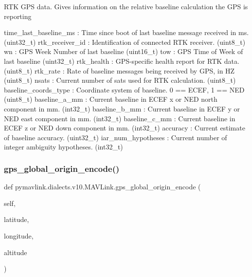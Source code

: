 \begin{DoxyVerb}
\begin{DoxyVerb}
\begin{DoxyVerb}RTK GPS data. Gives information on the relative baseline calculation
the GPS is reporting

time_last_baseline_ms        : Time since boot of last baseline message received in ms. (uint32_t)
rtk_receiver_id           : Identification of connected RTK receiver. (uint8_t)
wn                        : GPS Week Number of last baseline (uint16_t)
tow                       : GPS Time of Week of last baseline (uint32_t)
rtk_health                : GPS-specific health report for RTK data. (uint8_t)
rtk_rate                  : Rate of baseline messages being received by GPS, in HZ (uint8_t)
nsats                     : Current number of sats used for RTK calculation. (uint8_t)
baseline_coords_type        : Coordinate system of baseline. 0 == ECEF, 1 == NED (uint8_t)
baseline_a_mm             : Current baseline in ECEF x or NED north component in mm. (int32_t)
baseline_b_mm             : Current baseline in ECEF y or NED east component in mm. (int32_t)
baseline_c_mm             : Current baseline in ECEF z or NED down component in mm. (int32_t)
accuracy                  : Current estimate of baseline accuracy. (uint32_t)
iar_num_hypotheses        : Current number of integer ambiguity hypotheses. (int32_t)\end{DoxyVerb}
 \mbox{\label{classpymavlink_1_1dialects_1_1v10_1_1MAVLink_a9f147a41073aaf2334e0d2d7d564bc63}} 
\subsubsection{\texorpdfstring{gps\+\_\+global\+\_\+origin\+\_\+encode()}{gps\_global\_origin\_encode()}}
{\footnotesize\ttfamily def pymavlink.\+dialects.\+v10.\+M\+A\+V\+Link.\+gps\+\_\+global\+\_\+origin\+\_\+encode (\begin{DoxyParamCaption}\item[{}]{self,  }\item[{}]{latitude,  }\item[{}]{longitude,  }\item[{}]{altitude }\end{DoxyParamCaption})}


\end{DoxyVerb}
\end{DoxyVerb}
